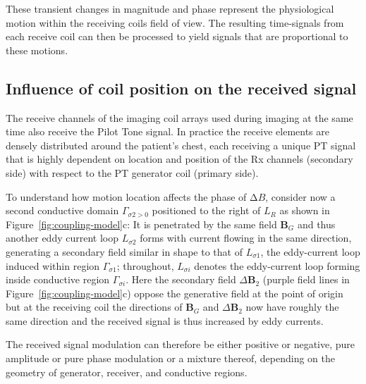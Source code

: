 \documentclass[
]{article}
\begin{document}
These transient changes in magnitude and phase represent the physiological motion within the
receiving coils field of view. The resulting time-signals from each
receive coil can then be processed to yield signals that are
proportional to these motions.

\subsection{Influence of coil position on the received
signal}\label{influence-of-coil-position-on-the-received-signal}

The receive channels of the imaging coil arrays
used during imaging at the same time also receive the Pilot Tone signal.
In practice the receive elements are densely distributed around the
patient's chest, each receiving a unique PT signal that is highly
dependent on location and position of the Rx channels (secondary side)
with respect to the PT generator coil (primary side).

To understand how motion location affects the phase of
$\mathrm{\Delta}B$, consider now a second conductive domain
$\Gamma_{\sigma 2 > 0}$ positioned to the right of $L_{R}$ as shown
in Figure~\ref{fig:coupling-model}c: It is penetrated by the same field $\mathbf{B}_{G}$ and
thus another eddy current loop $L_{\sigma 2}$ forms with current
flowing in the same direction, generating a secondary field similar in
shape to that of $L_{\sigma 1}$, the eddy-current loop induced within region $\Gamma_{\sigma 1}$; throughout, $L_{\sigma i}$ denotes the eddy-current loop forming inside conductive region $\Gamma_{\sigma i}$. Here the secondary field
${\Delta\mathbf{B}}_{2}$ (purple field lines in Figure~\ref{fig:coupling-model}c) oppose the
generative field at the point of origin but at the receiving coil the
directions of $\mathbf{B}_{G}$ and $\Delta\mathbf{B}_{2}$ now have
roughly the same direction and the received signal is thus increased by
eddy currents.

The received signal modulation can therefore be either positive or
negative, pure amplitude or pure phase modulation or a mixture thereof,
depending on the geometry of generator, receiver, and conductive
regions.
\end{document}
